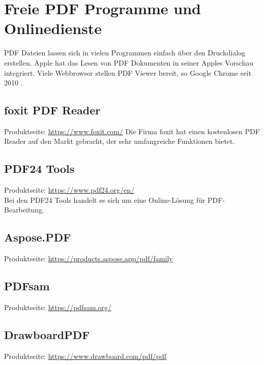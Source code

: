 \section{Freie PDF Programme und Onlinedienste}
PDF Dateien lassen sich in vielen Programmen einfach über den Druckdialog erstellen. Apple hat das Lesen von PDF Dokumenten in seiner Apples Vorschau integriert. Viele Webbrowser stellen PDF Viewer bereit, so Google Chrome seit 2010 \cite{wiki-pdf-de}.

\subsection{foxit PDF Reader}
Produktseite: \url{https://www.foxit.com/}
Die Firma foxit hat einen kostenlosen PDF Reader auf den Markt gebracht, der sehr umfangreiche Funktionen bietet.

\subsection{PDF24 Tools}
Produktseite: \url{https://www.pdf24.org/en/} \\
Bei den PDF24 Tools handelt es sich um eine Online-Lösung für PDF-Bearbeitung.

\subsection{Aspose.PDF}
Produktseite: \url{https://products.aspose.app/pdf/family} \\


\subsection{PDFsam}
Produktseite: \url{https://pdfsam.org/}

\subsection{DrawboardPDF}
Produktseite: \url{https://www.drawboard.com/pdf/pdf}

